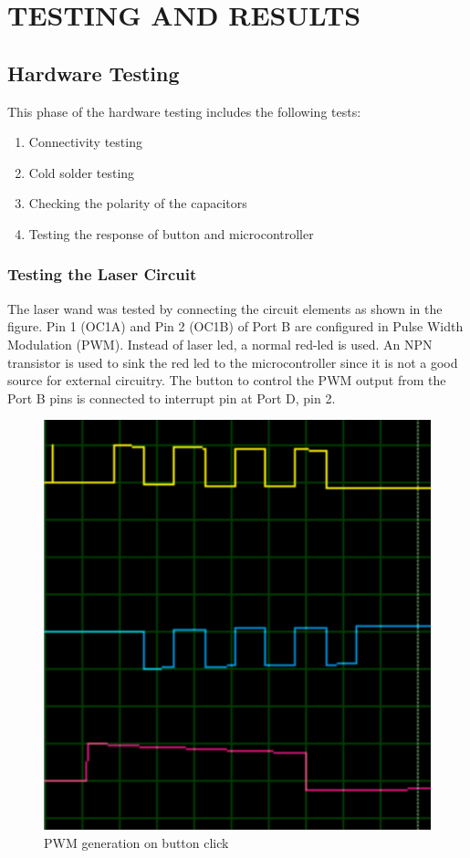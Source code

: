 \documentclass[12pt, a4paper]{article}
\begin{document}
\newpage

\section{TESTING AND RESULTS}
\subsection{Hardware Testing}

This phase of the hardware testing includes the following tests:
\begin{enumerate}
\item Connectivity testing
\item Cold solder testing
\item Checking the polarity of the capacitors
\item Testing the response of button and microcontroller
\end{enumerate}

\subsubsection{Testing the Laser Circuit}

The laser wand was tested by connecting the circuit elements as shown in the figure. Pin 1 (OC1A) and Pin 2 (OC1B) of Port B are configured in Pulse Width Modulation (PWM). Instead of laser led, a normal red-led is used. An NPN transistor is used to sink the red led to the microcontroller since it is not a good source for external circuitry. The button to control the PWM output from the Port B pins is connected to interrupt pin at Port D, pin 2.

\begin{figure}[htp]
\centering
\includegraphics[scale=0.30]{afterpress.png}
\caption{PWM generation on button click}
\label{}
\end{figure}
\end{document}
